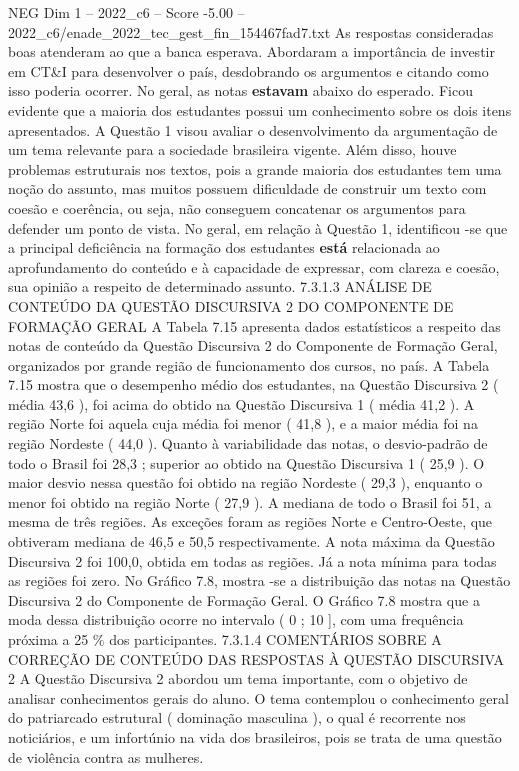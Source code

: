 \begin{textsample}{NEG Dim 1 – 2022\_c6 – Score -5.00 – 2022\_c6/enade\_2022\_tec\_gest\_fin\_154467fad7.txt}
As respostas consideradas boas atenderam ao que a banca esperava.
Abordaram a importância de investir em CT\&I para desenvolver o país, desdobrando os argumentos e citando como isso poderia ocorrer.
No geral, as notas \textbf{estavam} abaixo do esperado.
Ficou evidente que a maioria dos estudantes possui um conhecimento sobre os dois itens apresentados.
A Questão 1 visou avaliar o desenvolvimento da argumentação de um tema relevante para a sociedade brasileira vigente.
Além disso, houve problemas estruturais nos textos, pois a grande maioria dos estudantes tem uma noção do assunto, mas muitos possuem dificuldade de construir um texto com coesão e coerência, ou seja, não conseguem concatenar os argumentos para defender um ponto de vista.
No geral, em relação à Questão 1, identificou -se que a principal deficiência na formação dos estudantes \textbf{está} relacionada ao aprofundamento do conteúdo e à capacidade de expressar, com clareza e coesão, sua opinião a respeito de determinado assunto. 7.3.1.3 ANÁLISE DE CONTEÚDO DA QUESTÃO DISCURSIVA 2 DO COMPONENTE DE FORMAÇÃO GERAL A Tabela 7.15 apresenta dados estatísticos a respeito das notas de conteúdo da Questão Discursiva 2 do Componente de Formação Geral, organizados por grande região de funcionamento dos cursos, no país.
A Tabela 7.15 mostra que o desempenho médio dos estudantes, na Questão Discursiva 2 ( média 43,6 ), foi acima do obtido na Questão Discursiva 1 ( média 41,2 ).
A região Norte foi aquela cuja média foi menor ( 41,8 ), e a maior média foi na região Nordeste ( 44,0 ).
Quanto à variabilidade das notas, o desvio-padrão de todo o Brasil foi 28,3 ; superior ao obtido na Questão Discursiva 1 ( 25,9 ).
O maior desvio nessa questão foi obtido na região Nordeste ( 29,3 ), enquanto o menor foi obtido na região Norte ( 27,9 ).
A mediana de todo o Brasil foi 51, a mesma de três regiões.
As exceções foram as regiões Norte e Centro-Oeste, que obtiveram mediana de 46,5 e 50,5 respectivamente.
A nota máxima da Questão Discursiva 2 foi 100,0, obtida em todas as regiões.
Já a nota mínima para todas as regiões foi zero.
No Gráfico 7.8, mostra -se a distribuição das notas na Questão Discursiva 2 do Componente de Formação Geral.
O Gráfico 7.8 mostra que a moda dessa distribuição ocorre no intervalo ( 0 ; 10 ], com uma frequência próxima a 25 \% dos participantes. 7.3.1.4 COMENTÁRIOS SOBRE A CORREÇÃO DE CONTEÚDO DAS RESPOSTAS À QUESTÃO DISCURSIVA 2 A Questão Discursiva 2 abordou um tema importante, com o objetivo de analisar conhecimentos gerais do aluno.
O tema contemplou o conhecimento geral do patriarcado estrutural ( dominação masculina ), o qual é recorrente nos noticiários, e um infortúnio na vida dos brasileiros, pois se trata de uma questão de violência contra as mulheres.

\end{textsample}
